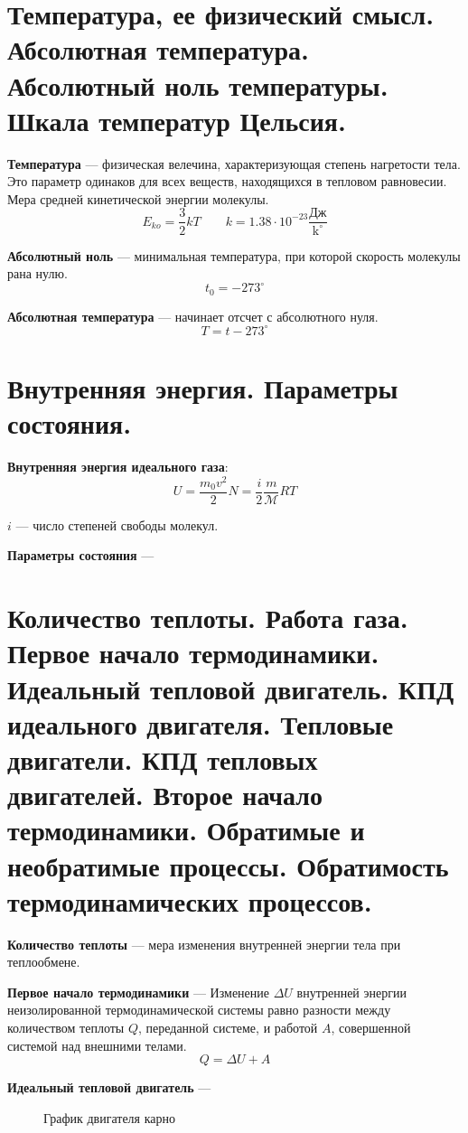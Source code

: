 \documentclass{report}
\begin{document}
\part{Температура, ее физический смысл. 
Абсолютная температура. 
Абсолютный ноль температуры. 
Шкала температур Цельсия.}

{\bf Температура} ---
физическая велечина, характеризующая степень нагретости тела. Это параметр одинаков для всех 
веществ, находящихся в тепловом равновесии. Мера средней кинетической энергии молекулы.
$$
E_{ko}=\frac{3}{2}kT \qquad k=1.38\cdot 10^{-23}\frac{\textrm{Дж}}{\textrm{k}^\circ}
$$

{\bf Абсолютный ноль} ---
минимальная температура, при которой скорость молекулы рана нулю.
$$
t_0=-273^\circ
$$

{\bf Абсолютная температура} ---
начинает отсчет с абсолютного нуля.
$$
T=t-273^\circ
$$



\part{Внутренняя энергия. 
Параметры состояния.}

{\bf Внутренняя энергия идеального газа}:
$$
U=\frac{m_0v^2}{2}N=\frac{i}{2}\frac{m}{\mathcal{M}}RT
$$

$i$ --- число степеней свободы молекул.

{\bf Параметры состояния} ---



\part{Количество теплоты. 
Работа газа. 
Первое начало термодинамики.
Идеальный тепловой двигатель. 
КПД идеального двигателя. 
Тепловые двигатели. 
КПД тепловых двигателей. 
Второе начало термодинамики. 
Обратимые и необратимые процессы. 
Обратимость термодинамических процессов.}

{\bf Количество теплоты} ---
мера изменения внутренней энергии тела при теплообмене.

{\bf Первое начало термодинамики} ---
Изменение $\Delta U$ внутренней энергии неизолированной термодинамической системы равно разности 
между количеством теплоты $Q$, переданной системе, и работой $A$, совершенной системой над 
внешними телами.
$$
Q=\Delta U + A
$$

{\bf Идеальный тепловой двигатель} ---

\begin{figure}[bh]
  \noindent{}
  \caption{График двигателя карно}
\end{figure}
\end{document}
